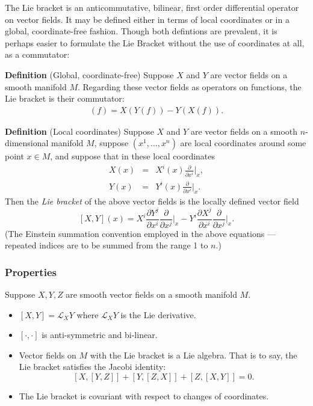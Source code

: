 \documentclass[12pt]{article}
\begin{document}
The Lie bracket is an anticommutative, bilinear, first order differential operator on vector fields.  It may be defined either in terms of local coordinates or in a global, coordinate-free fashion.  Though both defintions are prevalent, it is perhaps easier to formulate the Lie Bracket without the use of coordinates at all, as a commutator:

{\bf Definition} (Global, coordinate-free) Suppose $X$ and $Y$ are vector fields on a smooth manifold $M$.  Regarding these vector fields as operators on functions, the Lie bracket is their commutator:
\begin{align*}
[X,Y](f)=X(Y(f))-Y(X(f)).
\end {align*}

{\bf Definition} (Local coordinates) Suppose $X$ and $Y$ are vector fields on a smooth $n$-dimensional manifold $M$,
suppose $(x^1,\ldots, x^n)$ are local coordinates around some point $x\in M$, 
and suppose that in these local coordinates
\begin{eqnarray*}
X(x)&=&X^i(x) \frac{\partial}{\partial x^i}\Big|_x, \\
Y(x)&=&Y^i(x) \frac{\partial}{\partial x^i}\Big|_x.
\end{eqnarray*}
Then the \emph{Lie bracket} of the above vector fields is the locally defined vector field
$$[X,Y](x) = X^i \frac{\partial Y^j}{\partial x^i} \frac{\partial}{\partial x^j}\Big|_x-Y^i \frac{\partial X^j}{\partial x^i} \frac{\partial}{\partial x^j}\Big|_x.$$
(The Einstein summation convention employed in the above equations ---
repeated indices are to be summed from the range 1 to $n$.)

\subsubsection*{Properties}
Suppose $X,Y,Z$ are smooth vector fields on a smooth manifold $M$. 
\begin{itemize}
 \item $[X,Y]=\mathcal{L}_XY$ where $\mathcal{L}_XY$ is the Lie derivative.
 \item $[\cdot,\cdot]$ is anti-symmetric and bi-linear. 
\item Vector fields on $M$ with the Lie bracket is a Lie algebra. That is to say, the Lie bracket satisfies the Jacobi identity:
 \[ [X,[Y,Z]] + [Y,[Z,X]] + [Z,[X,Y]]=0. \]
\item The Lie bracket is covariant with respect to changes of coordinates.
 \end{itemize}

\end{document}
